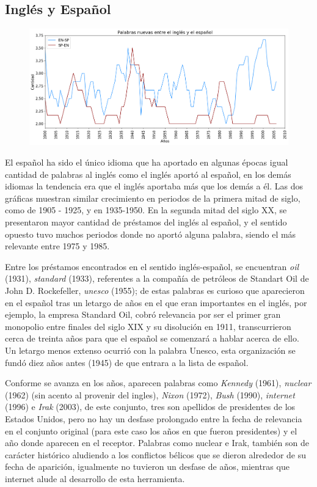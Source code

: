 \newpage


\subsection{Inglés y Español}
\begin{figure}[h!]
	\centering
	\includegraphics[scale=.38]{Cap_2/NC_4_S2_EN.png}
	\label{NC_ES}
	\caption{}
\end{figure}

El español ha sido el único idioma que ha aportado en algunas épocas igual cantidad de palabras al inglés como el inglés aportó al español,  en los demás idiomas la tendencia era que el inglés aportaba más que los demás a él.  Las dos gráficas muestran similar crecimiento en periodos de la primera mitad de siglo,  como de 1905 - 1925, y en 1935-1950.  En la segunda mitad del siglo XX,  se presentaron mayor cantidad de préstamos del inglés al español, y el sentido opuesto tuvo muchos periodos donde no aportó alguna palabra,  siendo el más relevante entre 1975 y 1985. 

Entre los préstamos encontrados en el sentido inglés-español, se encuentran \textit{oil} (1931), \textit{standard} (1933),  referentes a la compañía de petróleos de Standart Oil de John D.  Rockefeller,  \textit{unesco} (1955); de estas palabras es curioso que aparecieron en el español tras un letargo de años en el que eran importantes en el inglés,  por ejemplo, la empresa Standard Oil, cobró relevancia por ser el primer gran monopolio entre finales del siglo XIX y su disolución en 1911,  transcurrieron cerca de treinta años para que el español se comenzará a hablar acerca de ello. Un letargo menos extenso ocurrió con la palabra Unesco, esta organización se fundó diez años antes (1945)  de que entrara a la lista de español.  

Conforme se avanza en los años, aparecen palabras como \textit{Kennedy} (1961), \textit{nuclear} (1962) (sin acento al provenir del ingles), \textit{Nixon} (1972),  \textit{Bush} (1990), \textit{internet} (1996) e  \textit{Irak} (2003),  de este conjunto, tres son apellidos de presidentes de los Estados Unidos, pero no hay un desfase prolongado entre la fecha de relevancia en el conjunto original (para este caso los años en que fueron presidentes) y el año donde aparecen en el receptor. Palabras como nuclear e Irak, también son de carácter histórico aludiendo a los conflictos bélicos que se dieron alrededor de su fecha de aparición, igualmente no tuvieron un desfase de años, mientras que internet alude al desarrollo de esta herramienta. 


